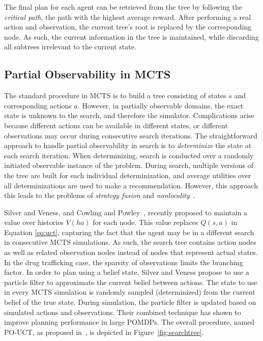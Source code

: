 \documentclass[conference]{IEEEtran}
\begin{document}
The final plan for each agent can be retrieved from the tree by following the \emph{critical path}, \ie the path with the highest average reward. After performing a real action and observation, the current tree's root is replaced by the corresponding node. As such, the current information in the tree is maintained, while discarding all subtrees irrelevant to the current state.

\subsection{Partial Observability in MCTS}
\label{sub:pomcts}

The standard procedure in MCTS is to build a tree consisting of states $s$ and corresponding actions $a$. However, in partially observable domains, the exact state is unknown to the search, and therefore the simulator. Complications arise because different actions can be available in different states, or different observations may occur during consecutive search iterations. The straightforward approach to handle partial observability in search is to \emph{determinize} the state at each search iteration. When determinizing, search is conducted over a randomly initiated observable instance of the problem. During search, multiple versions of the tree are built for each individual determinization, and average utilities over all determinizations are used to make a recommendation. However, this approach this leads to the problems of \emph{strategy fusion} and \emph{nonlocality}~\cite{cowling2012information}.

Silver and Veness, and Cowling and Powley~\cite{silver2010monte,cowling2012information}, recently proposed to maintain a value over histories $V(ha)$ for each node. This value replaces $Q(s,a)$ in Equation \ref{eq:uct}, capturing the fact that the agent may be in a different search in consecutive MCTS simulations. As such, the search tree contains action nodes as well as related observation nodes instead of nodes that represent actual states. In the drug trafficking case, the sparsity of observations limits the branching factor. In order to plan using a belief state, Silver and Veness propose to use a particle filter to approximate the current belief between actions. The state to use in every MCTS simulation is randomly sampled (\ie determinized) from the current belief of the true state. During simulation, the particle filter is updated based on simulated actions and observations. Their combined technique has shown to improve planning performance in large POMDPs. The overall procedure, named PO-UCT, as proposed in~\cite{silver2010monte}, is depicted in Figure~\ref{fig:searchtree}. 
\end{document}
